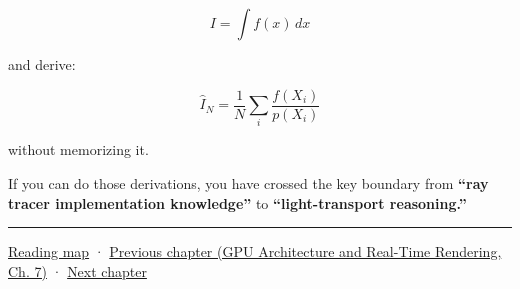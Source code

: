 \[
I=\int f(x)\,dx
\]

and derive:

\[
\boxed{
\hat I_N
=
\frac1N
\sum_i
\frac{f(X_i)}{p(X_i)}
}
\]

without memorizing it.

If you can do those derivations, you have crossed the key boundary from \textbf{``ray tracer implementation knowledge''} to \textbf{``light-transport reasoning.''}

\begin{center}\rule{0.5\linewidth}{0.5pt}\end{center}

\hyperref[volume-reading-map]{Reading map} · \href{../06-GPU-Architecture-and-Real-Time-Rendering/main.pdf\#nameddest=03-visual-computing-i-ch006-from-material-data-to-gpu-bindings}{Previous chapter (GPU Architecture and Real-Time Rendering, Ch. 7)} · \hyperref[03-visual-computing-i-ch008-sampling-directions-and-light-transport]{Next chapter}
